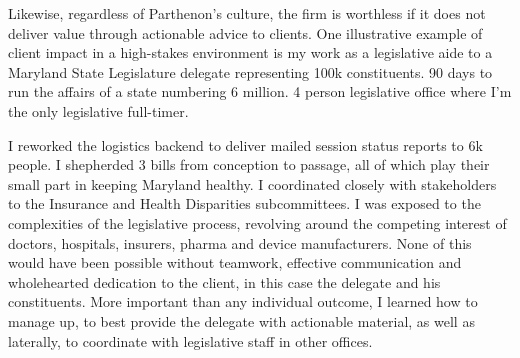 \documentclass[a4paper]{../res}
\begin{document}
\begin{sloppypar}
\begin{resume}
Likewise, regardless of Parthenon's culture, the firm is worthless if it does not deliver value through actionable advice to clients. One illustrative example of client impact in a high-stakes environment is my work as a legislative aide to a Maryland State Legislature delegate representing 100k constituents. 90 days to run the affairs of a state numbering 6 million. 4 person legislative office where I'm the only legislative full-timer.

I reworked the logistics backend to deliver mailed session status reports to 6k people. I shepherded 3 bills from conception to passage, all of which play their small part in keeping Maryland healthy. I coordinated closely with stakeholders to the Insurance and Health Disparities subcommittees. I was exposed to the complexities of the legislative process, revolving around the competing interest of doctors, hospitals, insurers, pharma and device manufacturers. None of this would have been possible without teamwork, effective communication and wholehearted dedication to the client, in this case the delegate and his constituents. More important than any individual outcome, I learned how to manage up, to best provide the delegate with actionable material, as well as laterally, to coordinate with legislative staff in other offices.







\end{resume}
\end{sloppypar}
\end{document}
